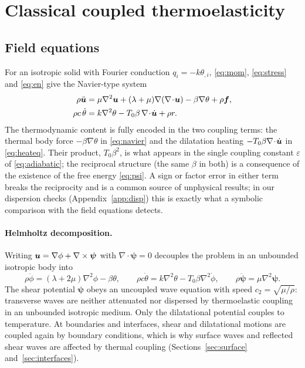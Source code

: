 \section{Classical coupled thermoelasticity}\label{sec:classical}
\subsection{Field equations}
For an isotropic solid with Fourier conduction $q_i=-k\theta_{,i}$, \eqref{eq:mom}, \eqref{eq:stress} and \eqref{eq:en} give the Navier-type system
\begin{align}
\rho\ddot{\bm u}&=\mu\nabla^2\bm u+(\lambda+\mu)\nabla(\nabla\!\cdot\!\bm u)-\beta\nabla\theta+\rho\bm f,\label{eq:navier}\\
\rho c\,\dot\theta&=k\nabla^2\theta-T_0\beta\,\nabla\!\cdot\!\dot{\bm u}+\rho r.\label{eq:heateq}
\end{align}
The thermodynamic content is fully encoded in the two coupling terms: the thermal body force $-\beta\nabla\theta$ in \eqref{eq:navier} and the dilatation heating $-T_0\beta\nabla\!\cdot\!\dot{\bm u}$ in \eqref{eq:heateq}. Their product, $T_0\beta^2$, is what appears in the single coupling constant $\varepsilon$ of \eqref{eq:adiabatic}; the reciprocal structure (the same $\beta$ in both) is a consequence of the existence of the free energy \eqref{eq:psi}. A sign or factor error in either term breaks the reciprocity and is a common source of unphysical results; in our dispersion checks (Appendix~\ref{app:disp}) this is exactly what a symbolic comparison with the field equations detects.

\paragraph{Helmholtz decomposition.} Writing $\bm u=\nabla\phi+\nabla\times\bm\psi$ with $\nabla\!\cdot\!\bm\psi=0$ decouples the problem in an unbounded isotropic body into
\begin{equation}
\rho\ddot\phi=(\lambda+2\mu)\nabla^2\phi-\beta\theta,\qquad
\rho c\dot\theta=k\nabla^2\theta-T_0\beta\nabla^2\dot\phi,\qquad
\rho\ddot{\bm\psi}=\mu\nabla^2\bm\psi.\label{eq:helm}
\end{equation}
The shear potential $\bm\psi$ obeys an uncoupled wave equation with speed $c_2=\sqrt{\mu/\rho}$: transverse waves are neither attenuated nor dispersed by thermoelastic coupling in an unbounded isotropic medium. Only the dilatational potential couples to temperature. At boundaries and interfaces, shear and dilatational motions are coupled again by boundary conditions, which is why surface waves and reflected shear waves are affected by thermal coupling (Sections~\ref{sec:surface} and~\ref{sec:interfaces}).

